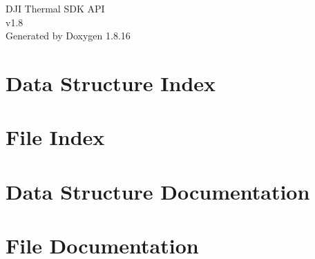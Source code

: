 \let\mypdfximage\pdfximage\def\pdfximage{\immediate\mypdfximage}\documentclass[twoside]{book}
\newcommand{\+}{\discretionary{\mbox{\scriptsize$\hookleftarrow$}}{}{}}
\newcommand{\clearemptydoublepage}{%
  \newpage{\pagestyle{empty}\cleardoublepage}%
}
\begin{document}
\hypersetup{pageanchor=false,
             bookmarksnumbered=true,
             pdfencoding=unicode
            }
\begin{titlepage}
\vspace*{7cm}
\begin{center}%
{\Large D\+JI Thermal S\+DK A\+PI \\[1ex]\large v1.\+8 }\\
\vspace*{1cm}
{\large Generated by Doxygen 1.8.16}\\
\end{center}
\end{titlepage}
\clearemptydoublepage
{}
\tableofcontents
\clearemptydoublepage
{}
\hypersetup{pageanchor=true}

\chapter{Data Structure Index}

\chapter{File Index}

\chapter{Data Structure Documentation}










\chapter{File Documentation}



\backmatter
\newpage
{}
\clearemptydoublepage
{}
\printindex
\end{document}
